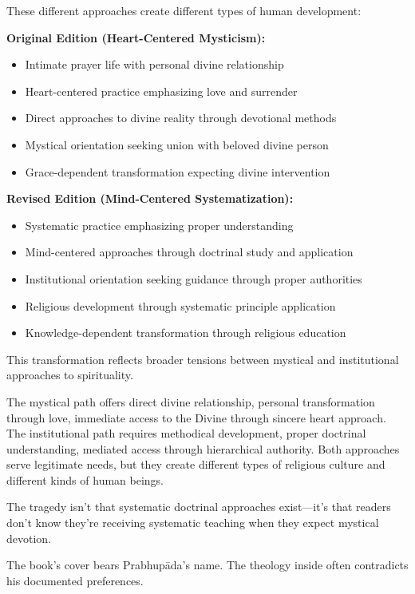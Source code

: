 \documentclass[12pt,twoside]{book}
\begin{document}
These different approaches create different types of human development:

\vspace{0.3cm}

\textbf{\textbf{Original Edition (Heart-Centered Mysticism):}}
\begin{itemize}
\item Intimate prayer life with personal divine relationship
\item Heart-centered practice emphasizing love and surrender
\item Direct approaches to divine reality through devotional methods
\item Mystical orientation seeking union with beloved divine person
\item Grace-dependent transformation expecting divine intervention
\end{itemize}

\textbf{\textbf{Revised Edition (Mind-Centered Systematization):}}
\begin{itemize}
\item Systematic practice emphasizing proper understanding
\item Mind-centered approaches through doctrinal study and application
\item Institutional orientation seeking guidance through proper authorities
\item Religious development through systematic principle application
\item Knowledge-dependent transformation through religious education
\end{itemize}

This transformation reflects broader tensions between mystical and institutional approaches to spirituality.

The mystical path offers direct divine relationship, personal transformation through love, immediate access to the Divine through sincere heart approach. The institutional path requires methodical development, proper doctrinal understanding, mediated access through hierarchical authority. Both approaches serve legitimate needs, but they create different types of religious culture and different kinds of human beings.

The tragedy isn't that systematic doctrinal approaches exist—it's that readers don't know they're receiving systematic teaching when they expect mystical devotion.

The book's cover bears Prabhupāda's name. The theology inside often contradicts his documented preferences.
\end{document}
